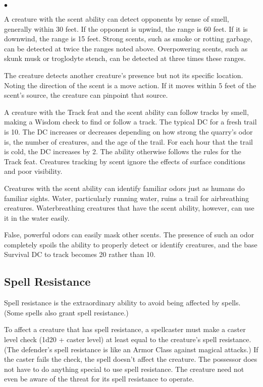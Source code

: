 \begin{list}{$\bullet$}{\itemspace}
	\item A creature with the scent ability can detect opponents by sense of smell, generally within 30 feet. If the opponent is upwind, the range is 60 feet. If it is downwind, the range is 15 feet. Strong scents, such as smoke or rotting garbage, can be detected at twice the ranges noted above. Overpowering scents, such as skunk musk or troglodyte stench, can be detected at three times these ranges.
	\item The creature detects another creature's presence but not its specific location. Noting the direction of the scent is a move action. If it moves within 5 feet of the scent's source, the creature can pinpoint that source.
	\item A creature with the Track feat and the scent ability can follow tracks by smell, making a Wisdom check to find or follow a track. The typical DC for a fresh trail is 10. The DC increases or decreases depending on how strong the quarry's odor is, the number of creatures, and the age of the trail. For each hour that the trail is cold, the DC increases by 2. The ability otherwise follows the rules for the Track feat. Creatures tracking by scent ignore the effects of surface conditions and poor visibility.
	\item Creatures with the scent ability can identify familiar odors just as humans do familiar sights.
Water, particularly running water, ruins a trail for air\textendash breathing creatures. Water\textendash breathing creatures that have the scent ability, however, can use it in the water easily.
	\item False, powerful odors can easily mask other scents. The presence of such an odor completely spoils the ability to properly detect or identify creatures, and the base Survival DC to track becomes 20 rather than 10.
\end{list}

\subsection{Spell Resistance}

Spell resistance is the extraordinary ability to avoid being affected by spells. (Some spells also grant spell resistance.)

To affect a creature that has spell resistance, a spellcaster must make a caster level check (1d20 + caster level) at least equal to the creature's spell resistance. (The defender's spell resistance is like an Armor Class against magical attacks.) If the caster fails the check, the spell doesn't affect the creature. The possessor does not have to do anything special to use spell resistance. The creature need not even be aware of the threat for its spell resistance to operate.

